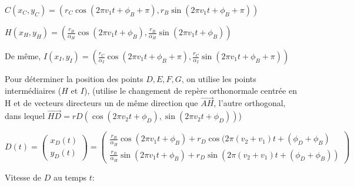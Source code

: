 \documentclass[11pt,a4paper]{article}
\begin{document}
$C(x_C,y_C) = (r_C \cos(2 \pi v_1 t + \phi_B + \pi),r_B \sin(2 \pi v_1 t + \phi_B + \pi))$

$H(x_H,y_H) = ( \frac{r_B}{\alpha_H} \cos(2 \pi v_1 t + \phi_B),\frac{r_B}{\alpha_H} \sin(2 \pi v_1 t + \phi_B))$

De même,
$I(x_I,y_I) = ( \frac{r_C}{\alpha_I} \cos(2 \pi v_1 t + \phi_B + \pi), \frac{r_C}{\alpha_I} \sin(2 \pi v_1 t + \phi_B + \pi))$

Pour déterminer la position des points $D,E,F,G$, on utilise les points intermédiaires ($H$ et $I$), (utilise le changement de repère  orthonormale centrée en H et de vecteurs directeurs un  de même direction que $\overrightarrow{AH}$, l'autre orthogonal, dans lequel $\overrightarrow{HD} =  rD( \cos(2 \pi v_2 t + \phi_D), \sin(2 \pi v_2 t + \phi_D))$)


$
D(t)=
\begin{pmatrix}
x_D(t) \\ 
y_D(t)
\end{pmatrix}
=
\begin{pmatrix}
\frac{r_B}{\alpha_H} \cos(2 \pi v_1 t + \phi_B) + r_D \cos(2 \pi (v_2 + v _1)t + (\phi_D + \phi_B) \\ 
\frac{r_B}{\alpha_H} \sin(2 \pi v_1 t + \phi_B ) + r_D \sin(2 \pi (v_2 +v_1)t +  (\phi_D + \phi_B))  
\end{pmatrix}
$

%
%
%


Vitesse de $D$ au temps $t$:

\end{document}
